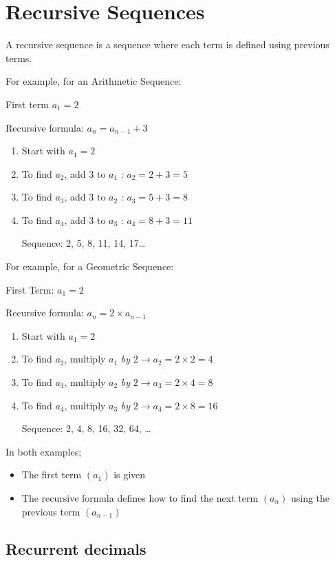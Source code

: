 \section{Recursive Sequences}

A recursive sequence is a sequence where each term is defined using previous
terms.

For example, for an Arithmetic Sequence:

First term $a_1 = 2$

Recursive formula: $a_n = a_{n-1} + 3$
\begin{enumerate}
  \item Start with $a_1 = 2$
  \item To find $a_2$, add 3 to $a_1$ : $a_2 = 2 + 3 = 5$
  \item To find $a_3$, add 3 to $a_2$ : $a_3 = 5 + 3 = 8$
  \item To find $a_4$, add 3 to $a_3$ : $a_4 = 8 + 3 = 11$

  Sequence: 2, 5, 8, 11, 14, 17\ldots
\end{enumerate}

For example, for a Geometric Sequence:

First Term: $a_1 = 2$

Recursive formula: $a_n = 2 \times a_{n-1}$
\begin{enumerate}
  \item Start with $a_1 = 2$
  \item To find $a_2$, multiply $a_1$ \textit{by} $2 \to a_2 = 2 \times 2 = 4$
  \item To find $a_3$, multiply $a_2$ \textit{by} $2 \to a_3 = 2 \times 4 = 8$
  \item To find $a_4$, multiply $a_3$ \textit{by} $2 \to a_4 = 2 \times 8 = 16$

  Sequence: 2, 4, 8, 16, 32, 64, \ldots
\end{enumerate}

In both examples;
\begin{itemize}
  \item The first term $(a_1)$ is given
  \item The recursive formula defines how to find the next term $(a_n)$ using the
  previous term $(a_{n-1})$
\end{itemize}

\subsection{Recurrent decimals}

